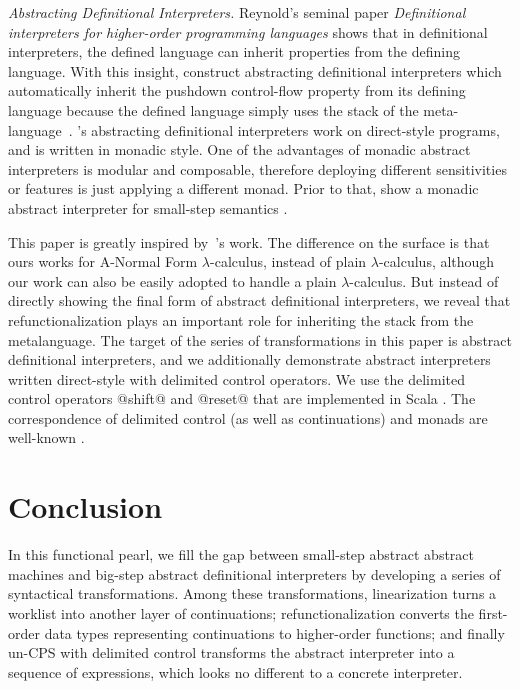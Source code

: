\documentclass[acmsmall, review]{acmart}\settopmatter{}
\begin{document}
\textit{Abstracting Definitional Interpreters.}
Reynold's seminal paper \emph{Definitional interpreters for higher-order programming languages} 
\cite{Reynolds:72, Reynolds:HOSC98-revisited} shows that in
definitional interpreters, the defined language can inherit properties from the defining language.
With this insight, \citeauthor{darais2017abstracting} construct abstracting
definitional interpreters which automatically inherit the pushdown control-flow
property from its defining language because the defined language simply uses the stack of the
meta-language~\cite{darais2017abstracting}. \citeauthor{darais2017abstracting}'s abstracting
definitional interpreters work on direct-style programs, and is written in monadic style. One
of the advantages of monadic abstract interpreters is modular and composable, therefore
deploying different sensitivities or features is just applying a different monad.
Prior to that, \citeauthor{Sergey:2013:MAI:2491956.2491979} show a monadic
abstract interpreter for small-step semantics \cite{Sergey:2013:MAI:2491956.2491979}.

This paper is greatly inspired by~\citeauthor{darais2017abstracting}'s work.
The difference on the surface is that ours works for A-Normal Form $\lambda$-calculus,
instead of plain $\lambda$-calculus, although our work can also be easily adopted to handle a plain
$\lambda$-calculus.
But instead of directly showing the final form of abstract definitional interpreters,
we reveal that refunctionalization plays an important role for inheriting the
stack from the metalanguage.
The target of the series of transformations in this paper is abstract definitional
interpreters, and we additionally demonstrate abstract interpreters written direct-style with
delimited control operators. 
We use the delimited control operators @shift@ and @reset@ that are implemented in Scala 
\cite{rompf2009implementing}. The correspondence of delimited control (as well as continuations) 
and monads are well-known \cite{Danvy:1990:AC:91556.91622, wadler1992essence, danvy1992representing, moggi1991notions}.

\section{Conclusion}\label{sec:conclusion}


In this functional pearl, we fill the gap between small-step abstract abstract machines 
and big-step abstract definitional interpreters by developing a series of syntactical 
transformations. Among these transformations, linearization turns a worklist into another
layer of continuations; refunctionalization converts the first-order data types representing
continuations to higher-order functions; and finally un-CPS with delimited control transforms
the abstract interpreter into a sequence of expressions, which looks no different to a
concrete interpreter.
\end{document}
